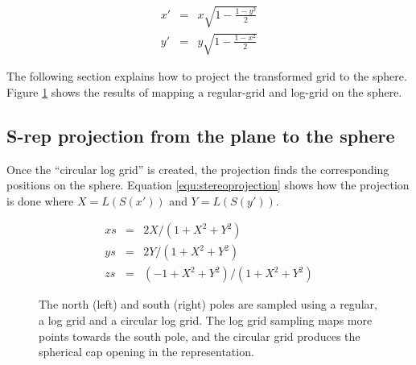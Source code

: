 \begin{equation}  
	\begin{array}{lcr}
		x' & = & x \sqrt{1 - \frac{1 - y^2}{2}} \\
		y' & = & y \sqrt{1 - \frac{1 - x^2}{2}} 
	\end{array}  
  \label{equ:squaretocircle}
\end{equation}


The following section explains how to project the transformed grid to the sphere.
Figure \ref{fig:SphereSamplingSphere} shows the results of mapping a regular-grid and log-grid on the sphere. 

\subsection{S-rep projection from the plane to the sphere}
\label{sec:StereographicProjection}

Once the ``circular log grid'' is created, the projection 
finds the corresponding positions on the sphere. 
Equation \ref{equ:stereoprojection} shows how the projection is done where $X = L(S(x'))$ and $Y = L(S(y'))$.

\begin{equation}  
	\begin{array}{lcc}
	    xs & = & 2X/(1 + X^2 + Y^2) \\
	    ys & = & 2Y/(1 + X^2 + Y^2) \\
	    zs & = & (-1 + X^2 + Y^2)/(1 + X^2 + Y^2)
	\end{array}
  \label{equ:stereoprojection}
\end{equation}

\begin{figure}[h!]
 \centering 
		      
 \caption[Sphere's north and south pole sampling.]{The north (left) and south (right) poles are sampled using a regular,  a log grid and a circular log grid. 
						     The log grid sampling maps more points towards the south pole, and the circular grid 
						     produces the spherical cap opening in the representation.}
 \label{fig:SphereSamplingSphere}  
\end{figure}

